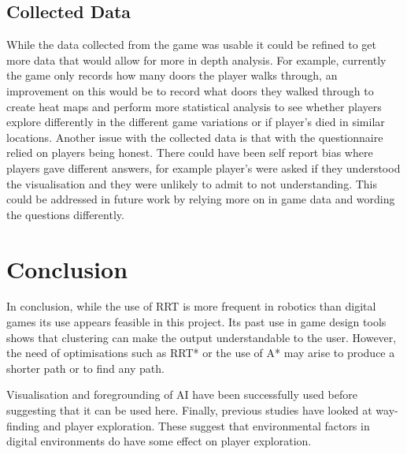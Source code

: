 \documentclass[journal]{IEEEtran}
\begin{document}
	\subsection{Collected Data}    
	While the data collected from the game was usable it could be refined to get more data that would allow for more in depth analysis. For example, currently the game only records how many doors the player walks through, an improvement on this would be to record what doors they walked through to create heat maps and perform more statistical analysis to see whether players explore differently in the different game variations or if player's died in similar locations.
	Another issue with the collected data is that with the questionnaire relied on players being honest. There could have been self report bias where players gave different answers, for example player's were asked if they understood the visualisation and they were unlikely to admit to not understanding. This could be addressed in future work by relying more on in game data and wording the questions differently.
	
	\section{Conclusion} 
	In conclusion, while the use of RRT is more frequent in robotics than digital games its use appears feasible in this project. Its past use in game design tools shows that clustering can make the output understandable to the user. However, the need of optimisations such as RRT* or the use of A* may arise to produce a shorter path or to find any path. 
	
	Visualisation and foregrounding of AI have been successfully used before suggesting that it can be used here. Finally, previous studies have looked at way-finding and player exploration. These suggest that environmental factors in digital environments do have some effect on player exploration.
	
	
	
	
	
	\appendices
	
	
	
\end{document}

